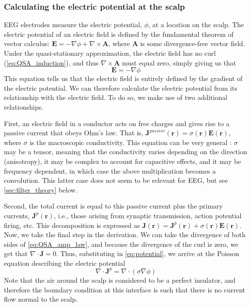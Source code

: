 \subsubsection{Calculating the electric potential at the scalp}
EEG electrodes measure the electric potential, $\phi$, at a location on the scalp. The electric potential of an electric field is defined by the fundamental theorem of vector calculus: $\bm{E} = - \nabla \phi + \nabla \times \bm{A}$, where $\bm{A}$ is some divergence-free vector field. Under the quasi-stationary approximation, the electric field has no curl (\ref{eq:QSA_induction}), and thus $\nabla \times \bm{A}$ must equal zero, simply giving us that 
\begin{equation} \label{eq:potential}
\bm{E} = -\nabla \phi
\end{equation}
This equation tells us that the electric field is entirely defined by the gradient of the electric potential. We can therefore calculate the electric potential from its relationship with the electric field. To do so, we make use of two additional relationships.

First, an electric field in a conductor acts on free charges and gives rise to a passive current that obeys Ohm's law. That is, $\bm{J}^{passive}(\bm{r}) = \sigma(\bm{r}) \bm{E}(\bm{r})$, where $\sigma$ is the macroscopic conductivity. This equation can be very general \cite{Pettersen2012}: $\sigma$ may be a tensor, meaning that the conductivity varies depending on the direction (anisotropy), it may be complex to account for capacitive effects, and it may be frequency dependent, in which case the above multiplication becomes a convolution. This latter case does not seem to be relevant for EEG, but see \autoref{sec:filter_theory} below.

Second, the total current is equal to this passive current plus the primary currents, $\bm{J}^p(\bm{r})$, i.e., those arising from synaptic transmission, action potential firing, etc. This decomposition is expressed as $\bm{J}(\bm{r}) = \bm{J}^p(\bm{r}) + \sigma(\bm{r}) \bm{E}(\bm{r})$. Now, we take the final step in the derivation. We can take the divergence of both sides of \ref{eq:QSA_amp_law}, and because the divergence of the curl is zero, we get that $\nabla \cdot \bm{J} = 0$. Thus, substituting in \ref{eq:potential}, we arrive at the Poisson equation describing the electric potential
\begin{equation} \label{eq:poisson}
    \nabla \cdot \bm{J}^p = \nabla \cdot \left(\sigma \nabla \phi \right)
\end{equation}
Note that the air around the scalp is considered to be a perfect insulator, and therefore the boundary condition at this interface is such that there is no current flow normal to the scalp. 

